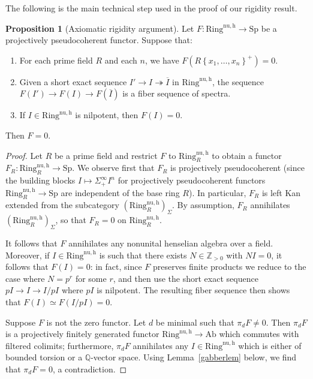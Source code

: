 \documentclass{amsart}
\newcommand{\Sp}{\mathrm{Sp}}
\theoremstyle{definition}
\newtheorem{proposition}[definition]{Proposition}
\newcommand{\nuh}{\mathrm{Ring}^{\mathrm{nu,h}}_R}
\newcommand{\nuzh}{\mathrm{Ring}^{\mathrm{nu,h}}}
\begin{document}
The following is the main technical step used in the proof of our rigidity
result. 

\begin{proposition}[Axiomatic rigidity argument] 
Let $F: \nuzh \to \Sp$ be a projectively pseudocoherent functor. Suppose that: 
\begin{enumerate}
\item For each prime field $R$ and each $n$, we have $F( R\left\{x_1, \dots, x_n\right\}^+) =
0$. 
\item Given a short exact sequence $I' \to I \twoheadrightarrow \overline{I}$ in
$\nuzh$, the sequence $F(I') \to F(I) \to F(\overline{I})$ is a fiber sequence
of spectra. 
\item If $I \in \nuzh$ is nilpotent, then $F(I) = 0$. 
\end{enumerate}
Then $F = 0$.\label{pseudoargument}
\end{proposition} 
\begin{proof} Let $R$ be a prime field  and
restrict $F$ to $\nuh$ to obtain a functor $F_R: \nuh \to \Sp$. 
We observe first that $F_R$ 
is projectively pseudocoherent  (since the building blocks $I
\mapsto \Sigma^\infty_+ I^n$ for
projectively pseudocoherent functors $\nuh \to \Sp$ are independent of the base ring $R$). 
In particular, $F_R$ is left Kan extended from the subcategory
$(\nuh)_{\Sigma}$. By assumption, $F_R$ annihilates $(\nuh)_\Sigma$, so that
$F_R = 0$ on $\nuh$. 

It follows that $F$ annihilates 
any nonunital henselian algebra over a field. 
Moreover, if $I \in \nuzh$ is such that there exists $N \in \mathbb{Z}_{>0}$
with $NI = 0$, it follows that $F(I) = 0$: in fact, since $F$ preserves finite
products we reduce to the case where
$N  = p^r$ for some $r$, and then use the short exact sequence
$pI \to I \to I/p I$ where $pI$ is nilpotent. 
The resulting fiber sequence then shows that $F(I) \simeq F(I/pI) = 0$. 


Suppose $F$ is not the zero functor. 
Let $d$ be minimal such that $\pi_d F \neq 0$. Then $\pi_d F$ is a
projectively finitely
generated functor $\nuzh \to \mathrm{Ab}$ which commutes with filtered
colimits; furthermore, $\pi_d F$ annihilates any $I \in \nuzh$ which is either
of bounded torsion or a $\mathbb{Q}$-vector space. Using 
Lemma~\ref{gabberlem} below, we find that $\pi_d F = 0$, a contradiction. 
\end{proof} 
\end{document}
